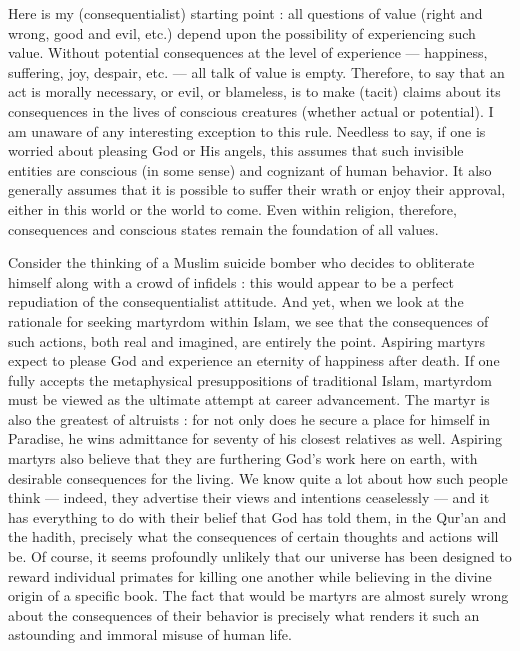 \documentclass[a4paper,14pt]{extbook}
\begin{document}
Here is my (consequentialist) starting point :
all questions of value (right and wrong, good and evil, etc.) depend upon the possibility of experiencing such value.
Without potential consequences at the level of experience --- happiness, suffering, joy, despair, etc. --- all talk of value is empty.
Therefore, to say that an act is morally necessary, or evil, or blameless, is to make (tacit) claims about its consequences in the lives of conscious creatures (whether actual or potential).
I am unaware of any interesting exception to this rule.
Needless to say, if one is worried about pleasing God or His angels, this assumes that such invisible entities are conscious (in some sense) and cognizant of human behavior.
It also generally assumes that it is possible to suffer their wrath or enjoy their approval, either in this world or the world to come.
Even within religion, therefore, consequences and conscious states remain the foundation of all values.

Consider the thinking of a Muslim suicide bomber who decides to obliterate himself along with a crowd of infidels :
this would appear to be a perfect repudiation of the consequentialist attitude.
And yet, when we look at the rationale for seeking martyrdom within Islam, we see that the consequences of such actions, both real and imagined, are entirely the point.
Aspiring martyrs expect to please God and experience an eternity of happiness after death.
If one fully accepts the metaphysical presuppositions of traditional Islam, martyrdom must be viewed as the ultimate attempt at career advancement.
The martyr is also the greatest of altruists :
for not only does he secure a place for himself in Paradise, he wins admittance for seventy of his closest relatives as well.
Aspiring martyrs also believe that they are furthering God's work here on earth, with desirable consequences for the living.
We know quite a lot about how such people think --- indeed, they advertise their views and intentions ceaselessly --- and it has everything to do with their belief that God has told them, in the Qur'an and the hadith, precisely what the consequences of certain thoughts and actions will be.
Of course, it seems profoundly unlikely that our universe has been designed to reward individual primates for killing one another while believing in the divine origin of a specific book.
The fact that would be martyrs are almost surely wrong about the consequences of their behavior is precisely what renders it such an astounding and immoral misuse of human life.
\end{document}
